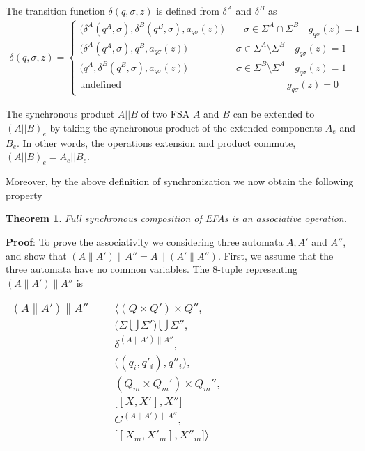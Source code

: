 \documentclass{article}
\newtheorem{theorem}{Theorem}
\begin{document}
 The transition function
$\delta(q,\sigma,z)$ is defined from $\delta^A$ and $\delta^B$ as
\begin{eqnarray}
\delta(q,\sigma,z)=\left\{
\begin{array}{ll}
\big(\delta^A(q^A,\sigma),\delta^B(q^B,\sigma),a_{q \sigma}(z)\big) \quad\quad \sigma\in \Sigma^A \cap \Sigma^B \quad g_{q \sigma}(z)=1\\
\big(\delta^A(q^A,\sigma),q^B,a_{q \sigma}(z)\big) \quad\quad\quad\quad\quad \sigma\in \Sigma^A \setminus \Sigma^B \quad g_{q \sigma}(z)=1\\
\big(q^A,\delta^B(q^B,\sigma),a_{q \sigma}(z)\big) \quad\quad\quad\quad\quad \sigma\in \Sigma^B \setminus \Sigma^A \quad g_{q \sigma}(z)=1\\
\textrm{
undefined}\quad\quad\quad\quad\quad\quad\quad\quad\quad\quad\quad\quad\quad\quad\quad\quad\quad
g_{q\sigma}(z)=0
\end{array}\right.
\end{eqnarray}

The synchronous product $A||B$ of two FSA $A$ and $B$ can be
extended to $(A||B)_e$ by taking the synchronous product of the
extended components  $A_e$ and $B_e$. In other words, the
operations extension and product commute, $(A||B)_e=A_e||B_e$.

Moreover, by the above definition of synchronization we now obtain
the following property

\begin{theorem}
   Full synchronous composition of EFAs is an associative
   operation.
\end{theorem}

\noindent \textbf{Proof}: To prove the associativity we
considering three automata $A, A'$ and $A''$, and show that
$(A\|A')\|A'' = A\|(A'\|A'')$. First, we assume that the three
automata have no common variables.
\newline\newline
\noindent The 8-tuple representing $(A\|A')\|A''$ is
\begin{center}
\begin{tabular}{ll}
  $(A\|A')\|A'' =$ & $\Big \langle (Q \times Q') \times Q'',$\\
  & $ \big(\Sigma \bigcup \Sigma' \big) \bigcup \Sigma'',$\\
  & $\delta^{(A\|A')\|A''},$\\
  & $\big((q_i, q'_i) , q''_i\big),$\\
  & $(Q_m \times Q_m') \times Q_m'',$\\
  & $\big[[X, X'], X'']$\\
  & $G^{(A\|A')\|A''},$\\
  & $\big[[X_m, X'_m], X''_m \big] \Big \rangle$
\end{tabular}
\end{center}
\end{document}
